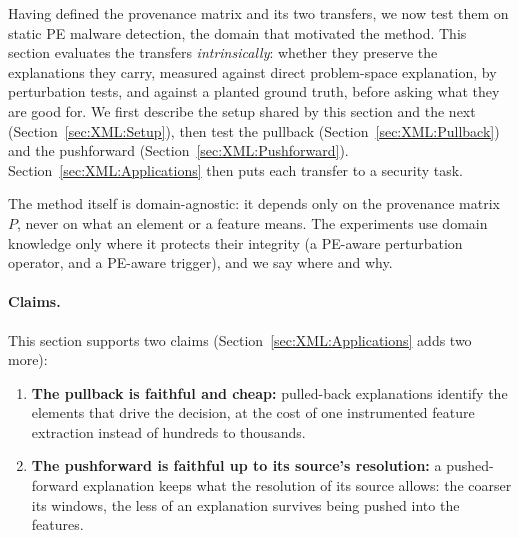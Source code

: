 Having defined the provenance matrix and its two transfers, we now test them on static PE malware detection, the domain that motivated the method. This section evaluates the transfers \emph{intrinsically}: whether they preserve the explanations they carry, measured against direct problem-space explanation, by perturbation tests, and against a planted ground truth, before asking what they are good for. We first describe the setup shared by this section and the next (Section~\ref{sec:XML:Setup}), then test the pullback (Section~\ref{sec:XML:Pullback}) and the pushforward (Section~\ref{sec:XML:Pushforward}). Section~\ref{sec:XML:Applications} then puts each transfer to a security task.

The method itself is domain-agnostic: it depends only on the provenance matrix $P$, never on what an element or a feature means. The experiments use domain knowledge only where it protects their integrity (a PE-aware perturbation operator, and a PE-aware trigger), and we say where and why.

\paragraph{Claims.} This section supports two claims (Section~\ref{sec:XML:Applications} adds two more):
\begin{enumerate}[noitemsep, topsep=2pt]
    \item \textbf{The pullback is faithful and cheap:} pulled-back explanations identify the elements that drive the decision, at the cost of one instrumented feature extraction instead of hundreds to thousands.
    \item \textbf{The pushforward is faithful up to its source's resolution:} a pushed-forward explanation keeps what the resolution of its source allows: the coarser its windows, the less of an explanation survives being pushed into the features.
\end{enumerate}

